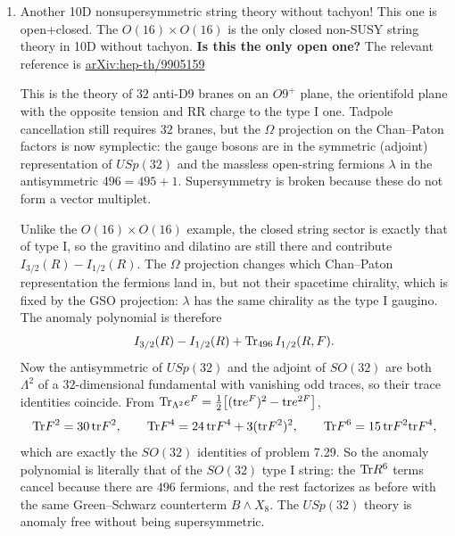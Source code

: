 \documentclass[11pt, class=article, crop=false]{standalone}
\begin{document}
\begin{enumerate}
	As before, in order to have factorization of the anomaly polynomial for the GS mechanism to work, we need the $\Tr R^4$ terms to cancel. This gives our desired constraint
	\[
		\frac{49}{144 \times 8} + \frac{(N_V - N_H - N_T)}{144 \times 40} - \frac{7}{144 \times 10} (N_T- 1) = 0 \Rightarrow N_H - N_V + 29 N_T = 273
	\]
	I think Kiritsis has a typo in this equation and it should be $\mathbf{+29} N_T$ rather than $-29$. This is consistent with \textbf{BBS exercise 5.9}.
	
	\item Another 10D nonsupersymmetric string theory without tachyon! This one is open+closed. The $O(16) \times O(16)$ is the only closed non-SUSY string theory in 10D without tachyon. \textbf{Is this the only open one?} The relevant reference is \href{https://arxiv.org/abs/hep-th/9905159}{arXiv:hep-th/9905159}
	
	This is the theory of $32$ anti-D9 branes on an $O9^+$ plane, the orientifold plane with the opposite tension and RR charge to the type I one. Tadpole cancellation still requires $32$ branes, but the $\Omega$ projection on the Chan--Paton factors is now symplectic: the gauge bosons are in the symmetric (adjoint) representation of $USp(32)$ and the massless open-string fermions $\lambda$ in the antisymmetric $496 = 495 + 1$. Supersymmetry is broken because these do not form a vector multiplet.
	
	Unlike the $O(16) \times O(16)$ example, the closed string sector is exactly that of type I, so the gravitino and dilatino are still there and contribute $I_{3/2}(R) - I_{1/2}(R)$. The $\Omega$ projection changes which Chan--Paton representation the fermions land in, but not their spacetime chirality, which is fixed by the GSO projection: $\lambda$ has the same chirality as the type I gaugino. The anomaly polynomial is therefore
	\[
		I_{3/2}(R) - I_{1/2}(R) + \mathrm{Tr}_{496}\, I_{1/2}(R, F).
	\]
	Now the antisymmetric of $USp(32)$ and the adjoint of $SO(32)$ are both $\Lambda^2$ of a $32$-dimensional fundamental with vanishing odd traces, so their trace identities coincide. From $\mathrm{Tr}_{\Lambda^2} e^F = \frac12 \big[(\mathrm{tr} e^F)^2 - \mathrm{tr} e^{2F}\big]$,
	\[
		\mathrm{Tr} F^2 = 30\, \mathrm{tr} F^2, \qquad \mathrm{Tr} F^4 = 24\, \mathrm{tr} F^4 + 3 (\mathrm{tr} F^2)^2, \qquad \mathrm{Tr} F^6 = 15\, \mathrm{tr} F^2 \mathrm{tr} F^4,
	\]
	which are exactly the $SO(32)$ identities of problem 7.29. So the anomaly polynomial is literally that of the $SO(32)$ type I string: the $\mathrm{Tr} R^6$ terms cancel because there are $496$ fermions, and the rest factorizes as before with the same Green--Schwarz counterterm $B \wedge X_8$. The $USp(32)$ theory is anomaly free without being supersymmetric.
	
	
\end{enumerate}
	
\end{document}
